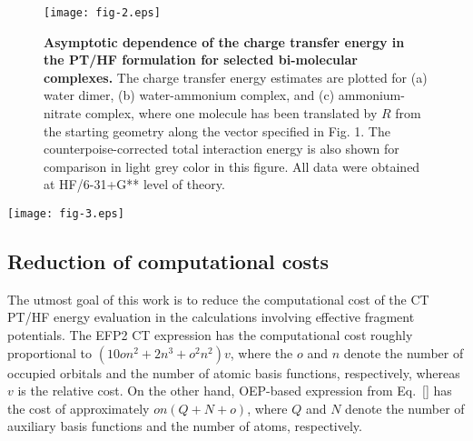 %
\begin{figure}[h]
\texttt{[image: fig-2.eps]}
\caption{\label{f:fig-1} {\bf Asymptotic dependence of the charge transfer energy
in the PT/HF formulation for selected bi\hyp{}molecular complexes.} 
The charge transfer energy estimates are plotted for 
(a) water dimer, 
(b) water\hyp{}ammonium complex, and 
(c) ammonium\hyp{}nitrate complex,
where one molecule has been translated by $R$ from the starting geometry
along the vector specified in Fig. 1.
The counterpoise\hyp{}corrected total interaction energy
is also shown for comparison in light grey color in this figure.
All data were obtained at HF/6-31+G** level of theory.
} 
\end{figure}
%

%
\begin{figure*}[h]
\texttt{[image: fig-3.eps]}
\caption{\label{f:fig-1} {\bf Performance of the OEP-based vs EFP2 method for the PT/HF charge transfer interaction energy.}
(a) accuracy of the ERI elimination technique; 
(b) accuracy of the OEP and EFP2 estimates of the CT energy with respect to the
PT/HF estimate. 
The structures of bi\hyp{}molecular complexes
were taken from the databases developed by the Truhlar's group:
the HB6/04 hydrogen bonding database 
(red),\cite{Zhao.Truhlar.JCTC.2005,Zhao.Schultz.Truhlar.JCTC.2006,Zhao.Schultz.Truhlar.JCP.2005}
the DI6/04 dipoleinteraction database 
(green),\cite{Zhao.Truhlar.JCTC.2005,Zhao.Schultz.Truhlar.JCTC.2006,Zhao.Schultz.Truhlar.JCP.2005}
the CT7/04 charge-transfer complex database 
(blue),\cite{Zhao.Truhlar.JCTC.2005,Zhao.Schultz.Truhlar.JCTC.2006,Zhao.Schultz.Truhlar.JCP.2005}
the WI7/05 weak interaction database 
(yellow),\cite{Zhao.Schultz.Truhlar.JCTC.2006,Zhao.Schultz.Truhlar.JCP.2005,Zhao.Truhlar.JPCA.2005}
and PPS5/05 the $\pi$-$\pi$ stacking database 
(black).\cite{Zhao.Schultz.Truhlar.JCTC.2006,Zhao.Schultz.Truhlar.JCP.2005,Zhao.Truhlar.JPCA.2005}
6-311++G** basis set was used for the CT energy calculations.
} 
\end{figure*}
%




\subsection{\label{s:413s6}Reduction of computational costs}

The utmost goal of this work is to reduce the computational cost of
the CT PT/HF energy evaluation in the calculations involving effective fragment
potentials. The EFP2 CT expression has the computational cost
roughly proportional to $(10on^2 + 2n^3 + o^2n^2)v$, where the
$o$ and $n$ denote the number of occupied orbitals and the number of atomic basis functions,
respectively, whereas $v$ is the relative cost. On the other hand, OEP\hyp{}based expression
from Eq.~\eqref{} has the cost of approximately $on(Q+N+o)$, where 
$Q$ and $N$ denote the number of auxiliary basis functions and the number of atoms,
respectively. 

